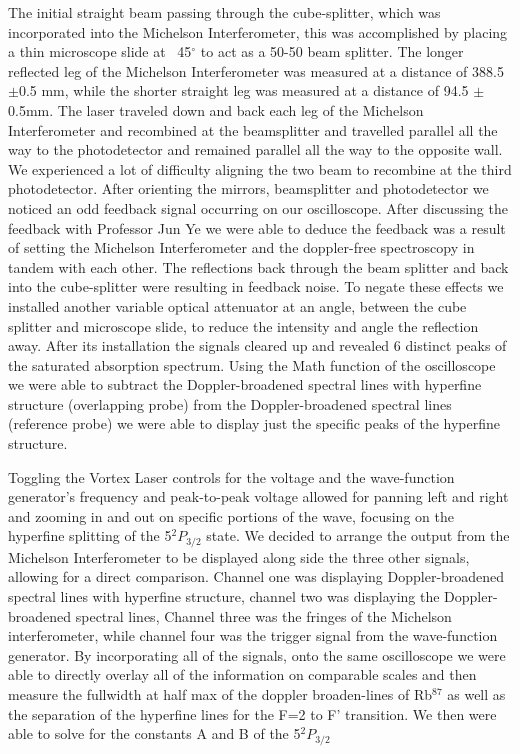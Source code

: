 \documentclass[12pt]{article}
\begin{document}
The initial straight beam passing through the cube-splitter, which was incorporated into the Michelson Interferometer, this was accomplished by placing a thin microscope slide at ~45$^{\circ}$ to act as a 50-50 beam splitter. The longer reflected leg of the Michelson Interferometer was measured at a distance of 388.5 $\pm $0.5 mm, while the shorter straight leg was measured at a distance of 94.5 $\pm $0.5mm. The laser traveled down and back each leg of the Michelson Interferometer and recombined at the beamsplitter and travelled parallel all the way to the photodetector and remained parallel all the way to the opposite wall. We experienced a lot of difficulty aligning the two beam to recombine at the third photodetector. After orienting the mirrors, beamsplitter and photodetector we noticed an odd feedback signal occurring on our oscilloscope. After discussing the feedback with Professor Jun Ye we were able to deduce the feedback was a result of setting the Michelson Interferometer and the doppler-free spectroscopy in tandem with each other. The reflections back through the beam splitter and back into the cube-splitter were resulting in feedback noise. To negate these effects we installed another variable optical attenuator at an angle, between the cube splitter and microscope slide, to reduce the intensity and angle the reflection away. After its installation the signals cleared up and revealed 6 distinct peaks of the saturated absorption spectrum. Using the Math function of the oscilloscope we were able to subtract the Doppler-broadened spectral lines with hyperfine structure (overlapping probe) from the Doppler-broadened spectral lines (reference probe) we were able to display just the specific peaks of the hyperfine structure. 

Toggling the Vortex Laser controls for the voltage and the wave-function generator's frequency and peak-to-peak voltage allowed for panning left and right and zooming in and out on specific portions of the wave, focusing on the hyperfine splitting of the 5$^2P_{3/2} $ state.  We decided to arrange the output from the Michelson Interferometer to be displayed along side the three other signals, allowing for a direct comparison. Channel one was displaying Doppler-broadened spectral lines with hyperfine structure, channel two was displaying the Doppler-broadened spectral lines, Channel three was the fringes of the Michelson interferometer, while channel four was the trigger signal from the wave-function generator. By incorporating all of the signals, onto the same oscilloscope we were able to directly overlay all of the information on comparable scales and then measure the fullwidth at half max  of the doppler broaden-lines of Rb$^{87} $ as well as the separation of the hyperfine lines for the F=2 to F' transition. We then were able to solve for the constants A and B of the 5$^2 P_{3/2}$
\end{document}

